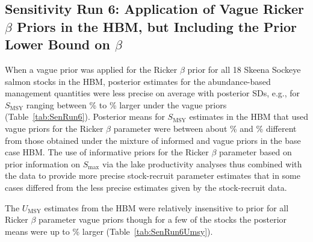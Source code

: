 \documentclass[french,11pt]{book}
\begin{document}
\endgroup{} \endgroup{}

\clearpage

\subsection{\texorpdfstring{Sensitivity Run 6: Application of Vague Ricker \(\beta\) Priors in the HBM, but Including the Prior Lower Bound on \(\beta\)}{Sensitivity Run 6: Application of Vague Ricker \textbackslash beta Priors in the HBM, but Including the Prior Lower Bound on \textbackslash beta}}\label{sensitivity-run-6-application-of-vague-ricker-beta-priors-in-the-hbm-but-including-the-prior-lower-bound-on-beta}

When a vague prior was applied for the Ricker \(\beta\) prior for all 18 Skeena Sockeye salmon stocks in the HBM, posterior estimates for the abundance-based management quantities were less precise on average with posterior SDs, e.g., for $S_\textrm{MSY}$ ranging between \% to \% larger under the vague priors (Table~\ref{tab:SenRun6}). Posterior means for \(S_\textrm{MSY}\) estimates in the HBM that used vague priors for the Ricker \(\beta\) parameter were between about \% and \% different from those obtained under the mixture of informed and vague priors in the base case HBM. The use of informative priors for the Ricker \(\beta\) parameter based on prior information on \(S_\textrm{max}\) via the lake productivity analyses thus combined with the data to provide more precise stock-recruit parameter estimates that in some cases differed from the less precise estimates given by the stock-recruit data.

The \(U_\textrm{MSY}\) estimates from the HBM were relatively insensitive to prior for all Ricker \(\beta\) parameter vague priors though for a few of the stocks the posterior means were up to \% larger (Table~\ref{tab:SenRun6Umsy}).
\end{document}

